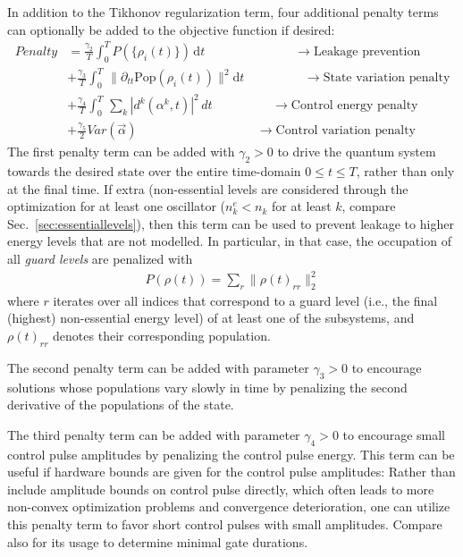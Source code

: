 \documentclass[11pt]{article}
\begin{document}
In addition to the Tikhonov regularization term, four additional penalty terms can optionally be added to the objective function if desired:
\begin{align*}
  Penalty &= \frac{\gamma_2}{T} \int_0^T P\left(\{\rho_i(t)\}\right) \, \mathrm{d} t   \hspace{3cm} \rightarrow \text{Leakage prevention}\\
         &+  \frac{\gamma_3}{T} \int_0^T \, \| \partial_{tt} \mbox{Pop}(\rho_i(t)) \|^2 \mathrm{d}t \hspace{2cm} \rightarrow \text{State variation penalty} \\
        &+\frac{\gamma_4}{T} \int_0^T \, \sum_k |d^k(\alpha^k,t)|^2\, dt  \hspace{2cm}\rightarrow  \text{Control energy penalty}\\
        &+ \frac{\gamma_5}{2} Var(\vec{\alpha}) \hspace{4cm}\rightarrow  \text{Control variation penalty}
\end{align*}
The first penalty term can be added with $\gamma_2 > 0$ to drive the quantum system towards the desired state over the entire time-domain $0\leq t\leq T$, rather than only at the final time. If extra (non-essential levels are considered through the optimization for at least one oscillator ($n_k^e < n_k$ for at least $k$, compare Sec.~\ref{sec:essentiallevels}), then this term can be used to prevent leakage to higher energy levels that are not modelled. In particular, in that case, the occupation of all \textit{guard levels} are penalized with  
\begin{align}\label{eq:leakprevention}
  P(\rho(t)) = \sum_{r} \| \rho(t)_{rr} \|^2_2
\end{align}
where $r$ iterates over all indices that correspond to a guard level (i.e., the final (highest) non-essential energy level) of at least one of the subsystems, and $\rho(t)_{rr}$ denotes their corresponding population. 

The second penalty term can be added with parameter $\gamma_3 > 0$ to encourage solutions whose populations vary slowly in time by penalizing the second derivative of the populations of the state. 

The third penalty term can be added with parameter $\gamma_4 > 0$ to encourage small control pulse amplitudes by penalizing the control pulse energy. This term can be useful if hardware bounds are given for the control pulse amplitudes: Rather than include amplitude bounds on control pulse directly, which often leads to more non-convex optimization problems and convergence deterioration, one can utilize this penalty term to favor short control pulses with small amplitudes. Compare also \cite{gunther2023practical} for its usage to determine minimal gate durations.
\end{document}
